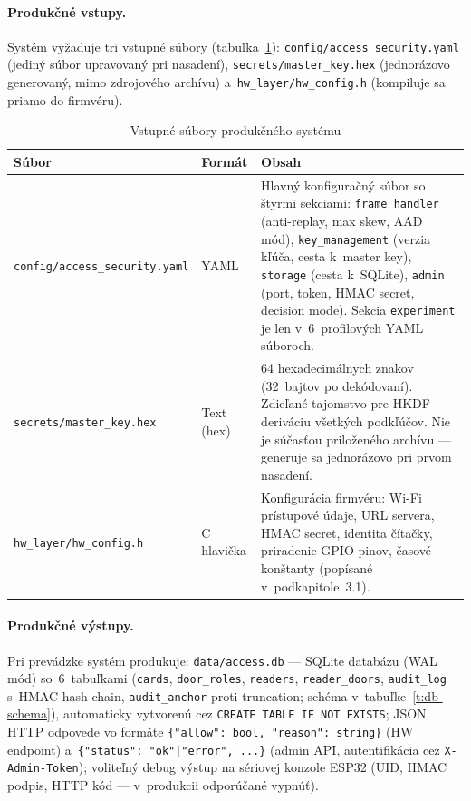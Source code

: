 \documentclass[a4paper]{feidipsp}
\begin{document}
\paragraph{Produkčné vstupy.}
Systém vyžaduje tri vstupné súbory (tabuľka~\ref{t:prod-inputs}): \texttt{config/access\_security.yaml} (jediný súbor upravovaný pri nasadení), \texttt{secrets/master\_key.hex} (jednorázovo generovaný, mimo zdrojového archívu) a~\texttt{hw\_layer/hw\_config.h} (kompiluje sa priamo do firmvéru).

\begin{table}[!htbp]
\centering
\footnotesize
\renewcommand{\arraystretch}{1.15}
\caption{Vstupné súbory produkčného systému}\label{t:prod-inputs}
\begin{tabular}{|l|l|p{5.5cm}|} \hline
\textbf{Súbor} & \textbf{Formát} & \textbf{Obsah} \\ \hline
\texttt{config/access\_security.yaml} & YAML & Hlavný konfiguračný súbor so štyrmi sekciami: \texttt{frame\_handler} (anti-replay, max skew, AAD mód), \texttt{key\_management} (verzia kľúča, cesta k~master key), \texttt{storage} (cesta k~SQLite), \texttt{admin} (port, token, HMAC secret, decision mode). Sekcia \texttt{experiment} je len v~6~profilových YAML súboroch. \\ \hline
\texttt{secrets/master\_key.hex} & Text (hex) & 64 hexadecimálnych znakov (32~bajtov po dekódovaní). Zdieľané tajomstvo pre HKDF deriváciu všetkých podkľúčov. Nie je súčasťou priloženého archívu --- generuje sa jednorázovo pri prvom nasadení. \\ \hline
\texttt{hw\_layer/hw\_config.h} & C hlavička & Konfigurácia firmvéru: Wi-Fi prístupové údaje, URL servera, HMAC secret, identita čítačky, priradenie GPIO pinov, časové konštanty (popísané v~podkapitole~3.1). \\ \hline
\end{tabular}
\end{table}

\paragraph{Produkčné výstupy.}
Pri prevádzke systém produkuje: \texttt{data/access.db} --- SQLite databázu (WAL mód) so~6~tabuľkami (\texttt{cards}, \texttt{door\_roles}, \texttt{readers}, \texttt{reader\_doors}, \texttt{audit\_log} s~HMAC hash chain, \texttt{audit\_anchor} proti truncation; schéma v~tabuľke~\ref{t:db-schema}), automaticky vytvorenú cez \texttt{CREATE TABLE IF NOT EXISTS}; JSON HTTP odpovede vo formáte \texttt{\{"allow": bool, "reason": string\}} (HW endpoint) a~\texttt{\{"status": "ok"|"error", ...\}} (admin API, autentifikácia cez \texttt{X-Admin-Token}); voliteľný debug výstup na sériovej konzole ESP32 (UID, HMAC podpis, HTTP kód --- v~produkcii odporúčané vypnúť).
\end{document}
